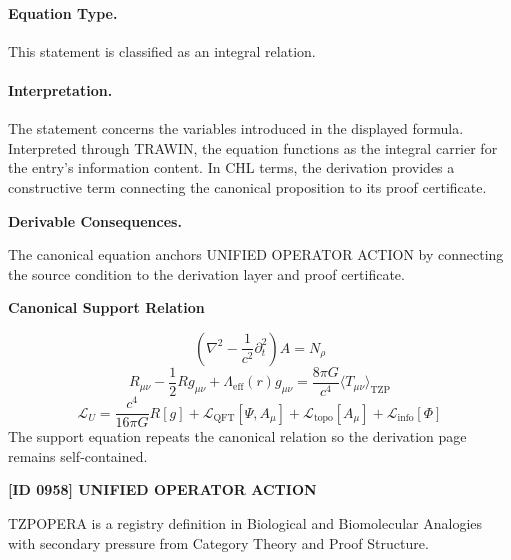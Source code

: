 \paragraph{Equation Type.}
This statement is classified as an integral relation.

\paragraph{Interpretation.}
The statement concerns the variables introduced in the displayed formula. Interpreted through TRAWIN, the equation functions as the integral carrier for the entry’s information content. In CHL terms, the derivation provides a constructive term connecting the canonical proposition to its proof certificate.

\par\vspace{0.35em}
\noindent\textbf{Derivable Consequences.}\quad
\begingroup
\footnotesize
\raggedright
The canonical equation anchors UNIFIED OPERATOR ACTION by connecting the source condition to the derivation layer and proof certificate.
\par\endgroup

\noindent\textbf{Canonical Support Relation}\par
\[
\left(\nabla^{2}-\frac{1}{c^{2}}\partial_{t}^{2}\right)A=N_{\rho}
\]
\[
R_{\mu\nu}-\frac{1}{2}Rg_{\mu\nu}+\Lambda_{\mathrm{eff}}(r)g_{\mu\nu}
=\frac{8\pi G}{c^{4}}\langle T_{\mu\nu}\rangle_{\mathrm{TZP}}
\]
\[
\mathcal{L}_{U}=\frac{c^{4}}{16\pi G}R[g]+\mathcal{L}_{\mathrm{QFT}}[\Psi,A_{\mu}]
+\mathcal{L}_{\mathrm{topo}}[A_{\mu}]+\mathcal{L}_{\mathrm{info}}[\Phi]
\]
\noindent The support equation repeats the canonical relation so the derivation page remains self-contained.\par

\clearpage
\noindent\textbf{[ID 0958] UNIFIED OPERATOR ACTION}\par
\vspace{0.35em}
\begingroup\small
{}
TZPOPERA is a registry definition in Biological and Biomolecular Analogies with secondary pressure from Category Theory and Proof Structure.


